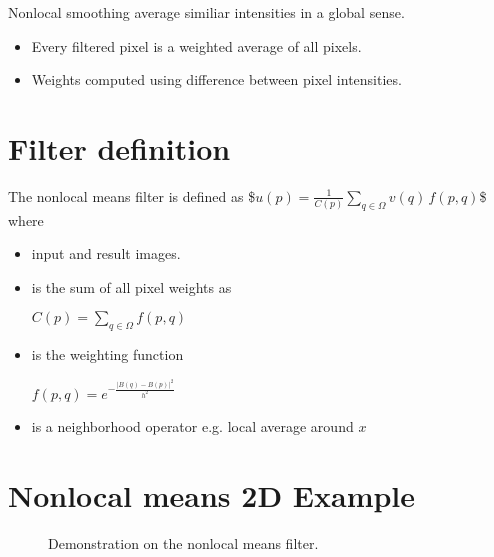 \documentclass[letterpaper,10pt,english]{sphinxmanual}
\begin{document}
\sphinxAtStartPar
Non\sphinxhyphen{}local smoothing average similiar intensities in a global sense.
\begin{itemize}
\item {} 
\sphinxAtStartPar
Every filtered pixel is a weighted average of all pixels.

\item {} 
\sphinxAtStartPar
Weights computed using difference between pixel intensities.

\end{itemize}

\sphinxAtStartPar
{}


\section{Filter definition}
\label{\detokenize{02-ImageEnhancement:filter-definition}}
\sphinxAtStartPar
The non\sphinxhyphen{}local means filter is defined as
\$\(u(p)=\frac{1}{C(p)}\sum_{q\in\Omega}v(q)\,f(p,q)\)\$
where
\begin{itemize}
\item {} 
\sphinxAtStartPar
{} input and result images.

\item {} 
\sphinxAtStartPar
{} is the sum of all pixel weights as

\sphinxAtStartPar
\(C(p)=\sum_{q\in\Omega}f(p,q)\)

\item {} 
\sphinxAtStartPar
{} is the weighting function

\sphinxAtStartPar
\(f(p,q)=e^{-\frac{|B(q)-B(p)|^2}{h^2}}\)

\item {} 
\sphinxAtStartPar
{} is a neighborhood operator e.g. local average around \(x\)

\end{itemize}


\section{Non\sphinxhyphen{}local means 2D \sphinxhyphen{} Example}
\label{\detokenize{02-ImageEnhancement:non-local-means-2d-example}}
\begin{figure}[htbp]
\centering
\capstart

\noindent{}
\caption{Demonstration on the non\sphinxhyphen{}local means filter.}\label{\detokenize{02-ImageEnhancement:id29}}\end{figure}
\end{document}
